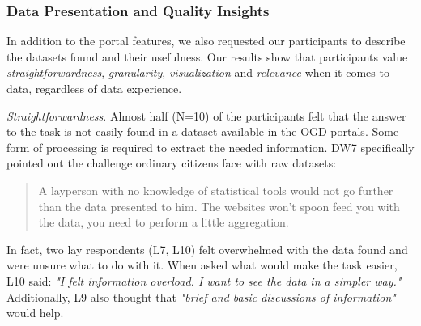 \documentclass{sigchi}
\begin{document}

\subsubsection{Data Presentation and Quality Insights}
In addition to the portal features, we also requested our participants to describe the datasets found and their usefulness. Our results show that participants value \textit{straightforwardness}, \textit{granularity}, \textit{visualization} and \textit{relevance} when it comes to data, regardless of data experience.

\textit{Straightforwardness}. Almost half (N=10) of the participants felt that the answer to the task is not easily found in a dataset available in the OGD portals. Some form of processing is required to extract the needed information. DW7 specifically pointed out the challenge ordinary citizens face with raw datasets:
\begin{quote}
A layperson with no knowledge of statistical tools would not go further than the data presented to him. The websites won't spoon feed you with the data, you need to perform a little aggregation.
\end{quote}

In fact, two lay respondents (L7, L10) felt overwhelmed with the data found and were unsure what to do with it. When asked what would make the task easier, L10 said: \textit{"I felt information overload. I want to see the data in a simpler way."} Additionally, L9 also thought that \textit{"brief and basic discussions of information"} would help.
\end{document}
